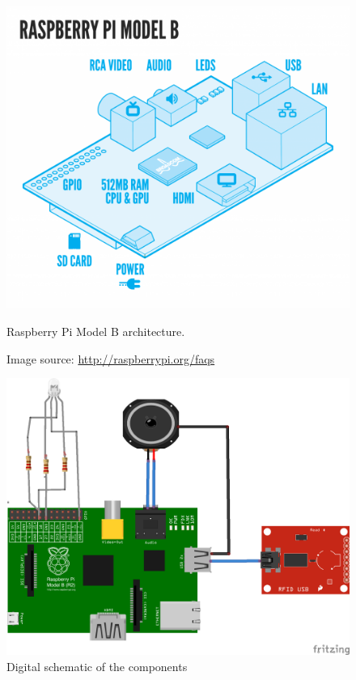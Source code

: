 \begin{figure}[H] 
	\begin{minipage}[t]{0.4\linewidth}
	\centering
		\includegraphics[width=0.3\paperwidth]{Pictures/rpi-arch-overview.png}
	\caption[Raspberry Pi Model B Architecture]{Raspberry Pi Model B architecture.}
	\caption*{Image source: \url{http://raspberrypi.org/faqs}}
	\label{fig:pi-arch-overview}
	\end{minipage}
	\hspace{2.0cm}
	\begin{minipage}[t]{0.4\linewidth}
		\centering
			\includegraphics[width=0.3\paperwidth]{Pictures/pi-fritzing-model.png}
		\caption{Digital schematic of the components}
		\label{fig:pi-fritzing}
	\end{minipage}
\end{figure}
 
